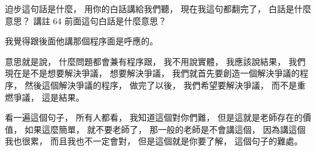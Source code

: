 \hypertarget{w06:cue:1990}{}迫步這句話是什麼，
\hypertarget{w06:cue:1991}{}用你的白話講給我們聽，
\hypertarget{w06:cue:1992}{}現在我這句都翻完了，
\hypertarget{w06:cue:1993}{}白話是什麼意思？
\hypertarget{w06:cue:1994}{}講註 64 前面這句白話是什麼意思？

\hypertarget{w06:cue:1995}{}我覺得跟後面他講那個程序面是呼應的。

\hypertarget{w06:cue:1996}{}意思就是說，
\hypertarget{w06:cue:1997}{}什麼問題都會兼有程序跟，
\hypertarget{w06:cue:1998}{}我不用說實體，
\hypertarget{w06:cue:1999}{}我應該說結果，
\hypertarget{w06:cue:2000}{}我們現在是不是想要解決爭議，
\hypertarget{w06:cue:2001}{}想要解決爭議，
\hypertarget{w06:cue:2002}{}我們就首先要創造一個解決爭議的程序，
\hypertarget{w06:cue:2003}{}然後這個解決爭議的程序，
\hypertarget{w06:cue:2004}{}做完了以後，
\hypertarget{w06:cue:2005}{}我們希望要解決爭議，
\hypertarget{w06:cue:2006}{}而不是重燃爭議，
\hypertarget{w06:cue:2007}{}這是結果。

\hypertarget{w06:cue:2008}{}看一遍這個句子，
\hypertarget{w06:cue:2009}{}所有人都看，
\hypertarget{w06:cue:2010}{}我知道這個對你們難，
\hypertarget{w06:cue:2011}{}但是這就是老師存在的價值，
\hypertarget{w06:cue:2012}{}如果這麼簡單，
\hypertarget{w06:cue:2013}{}就不要老師了，
\hypertarget{w06:cue:2014}{}那一般的老師是不會講這個，
\hypertarget{w06:cue:2015}{}因為講這個我也很累，
\hypertarget{w06:cue:2016}{}而且我也不一定會對，
\hypertarget{w06:cue:2017}{}但是這個就是你要了解，
\hypertarget{w06:cue:2018}{}這個句子的難處。

